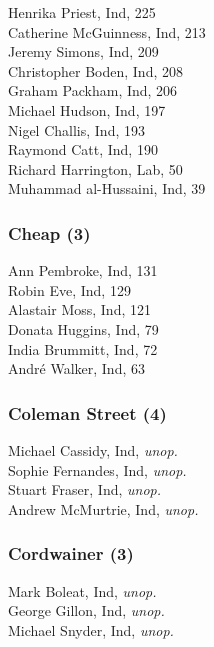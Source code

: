 \documentclass[a4paper,openany,10pt]{book}
\begin{document}


Henrika Priest, Ind, 225\\
Catherine McGuinness, Ind, 213\\
Jeremy Simons, Ind, 209\\
Christopher Boden, Ind, 208\\
Graham Packham, Ind, 206\\
Michael Hudson, Ind, 197\\
Nigel Challis, Ind, 193\\
Raymond Catt, Ind, 190\\
Richard Harrington, Lab, 50\\
Muhammad al-Hussaini, Ind, 39\\


\subsubsection*{Cheap (3)}



Ann Pembroke, Ind, 131\\
Robin Eve, Ind, 129\\
Alastair Moss, Ind, 121\\
Donata Huggins, Ind, 79\\
India Brummitt, Ind, 72\\
André Walker, Ind, 63\\


\subsubsection*{Coleman Street (4)}



Michael Cassidy, Ind, \emph{unop.}\\
Sophie Fernandes, Ind, \emph{unop.}\\
Stuart Fraser, Ind, \emph{unop.}\\
Andrew McMurtrie, Ind, \emph{unop.}\\


\subsubsection*{Cordwainer (3)}



Mark Boleat, Ind, \emph{unop.}\\
George Gillon, Ind, \emph{unop.}\\
Michael Snyder, Ind, \emph{unop.}\\
\end{document}
